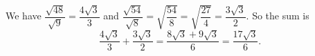 We have $\dfrac{\sqrt{48}}{\sqrt9}=\dfrac{4\sqrt3}{3}$ and $\dfrac{\sqrt{54}}{\sqrt8}=\sqrt{\dfrac{54}{8}}=\sqrt{\dfrac{27}{4}}=\dfrac{3\sqrt3}{2}$. So the sum is
\[\dfrac{4\sqrt3}{3}+\dfrac{3\sqrt3}{2}=\dfrac{8\sqrt3+9\sqrt3}{6}=\boxed{\dfrac{17\sqrt3}{6}}.\]
